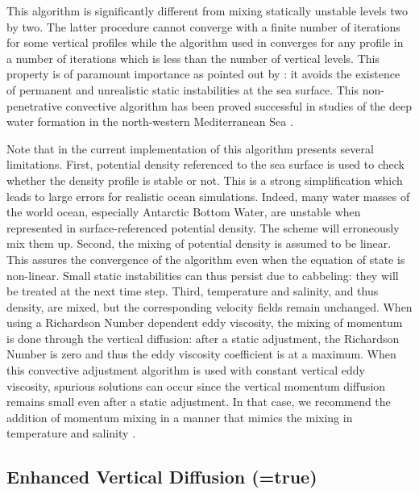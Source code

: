 This algorithm is significantly different from mixing statically unstable levels 
two by two. The latter procedure cannot converge with a finite number 
of iterations for some vertical profiles while the algorithm used in \NEMO 
converges for any profile in a number of iterations which is less than the 
number of vertical levels. This property is of paramount importance as 
pointed out by \citet{Killworth1989}: it avoids the existence of permanent 
and unrealistic static instabilities at the sea surface. This non-penetrative 
convective algorithm has been proved successful in studies of the deep 
water formation in the north-western Mediterranean Sea 
\citep{Madec_al_JPO91, Madec_al_DAO91, Madec_Crepon_Bk91}.

Note that in the current implementation of this algorithm presents several 
limitations. First, potential density referenced to the sea surface is used to 
check whether the density profile is stable or not. This is a strong 
simplification which leads to large errors for realistic ocean simulations. 
Indeed, many water masses of the world ocean, especially Antarctic Bottom
Water, are unstable when represented in surface-referenced potential density. 
The scheme will erroneously mix them up. Second, the mixing of potential 
density is assumed to be linear. This assures the convergence of the algorithm 
even when the equation of state is non-linear. Small static instabilities can thus 
persist due to cabbeling: they will be treated at the next time step. 
Third, temperature and salinity, and thus density, are mixed, but the 
corresponding velocity fields remain unchanged. When using a Richardson 
Number dependent eddy viscosity, the mixing of momentum is done through 
the vertical diffusion: after a static adjustment, the Richardson Number is zero 
and thus the eddy viscosity coefficient is at a maximum. When this convective 
adjustment algorithm is used with constant vertical eddy viscosity, spurious 
solutions can occur since the vertical momentum diffusion remains small even 
after a static adjustment. In that case, we recommend the addition of momentum 
mixing in a manner that mimics the mixing in temperature and salinity 
\citep{Speich_PhD92, Speich_al_JPO96}.

\subsection   [Enhanced Vertical Diffusion (\np{ln\_zdfevd})]
			{Enhanced Vertical Diffusion (=true)}
\label{ZDF_evd}

